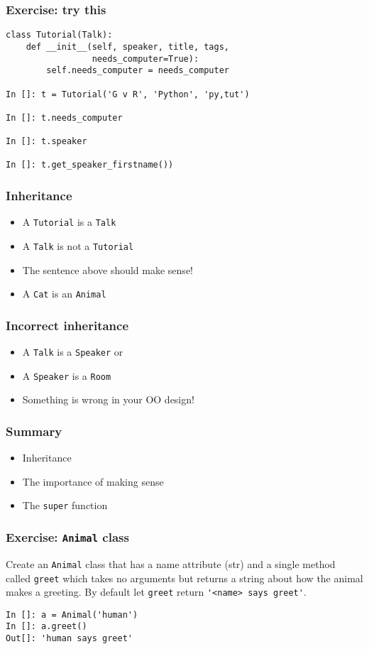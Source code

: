 \documentclass[14pt,compress,aspectratio=169]{beamer}
\begin{document}
\begin{frame}[fragile]
  \frametitle{Exercise: try this}
\begin{lstlisting}
class Tutorial(Talk):
    def __init__(self, speaker, title, tags,
                 needs_computer=True):
        self.needs_computer = needs_computer

In []: t = Tutorial('G v R', 'Python', 'py,tut')

In []: t.needs_computer

In []: t.speaker

In []: t.get_speaker_firstname())

\end{lstlisting}
\end{frame}

\begin{frame}
  \frametitle{Inheritance}
  \begin{itemize}
  \item A \lstinline{Tutorial} is a \lstinline{Talk}
  \item A \lstinline{Talk} is not a \lstinline{Tutorial}
  \item The sentence above should make sense!
  \item A \lstinline{Cat} is an \lstinline{Animal}
  \end{itemize}
\end{frame}

\begin{frame}
  \frametitle{Incorrect inheritance}
  \begin{itemize}
  \item A \lstinline{Talk} is a \lstinline{Speaker} or
  \item A \lstinline{Speaker} is a \lstinline{Room}
  \item Something is wrong in your OO design!
  \end{itemize}
\end{frame}

\begin{frame}[fragile]
  \frametitle{Summary}
  \begin{itemize}
  \item Inheritance
  \item The importance of making sense
  \item The \lstinline{super} function
  \end{itemize}
\end{frame}

\begin{frame}[fragile]
  \frametitle{Exercise: \lstinline{Animal} class}
  \begin{block}{}
    Create an \lstinline{Animal} class that has a name attribute (str) and a
    single method called \lstinline{greet} which takes no arguments but returns
    a string about how the animal makes a greeting.  By default let
    \lstinline{greet} return \lstinline{'<name> says greet'}.
  \end{block}
\begin{lstlisting}
In []: a = Animal('human')
In []: a.greet()
Out[]: 'human says greet'
\end{lstlisting}
\end{frame}
\end{document}
